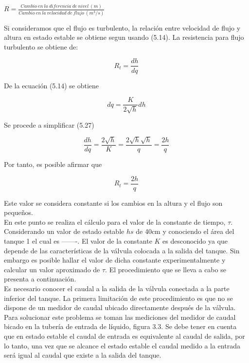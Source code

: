 \documentclass[a4paper,12pt,twoside]{proyectotanquesecci}
\begin{document}
\begin{center}
$R=\frac{Cambio\ en\ la\ diferencia\ de\ nivel\ (m)}{Cambio\ en\ la\ velocidad\ de\ flujo\ (m^{3}/s)}$
\end{center}

Si consideramos que el flujo es turbulento, la relación entre velocidad de flujo y altura en estado estable se obtiene segun usando (5.14). La resistencia para flujo turbulento se obtiene de:

\begin{equation}
R_{t}=\frac{dh}{dq}
\end{equation}

De la ecuación (5.14) se obtiene

\begin{equation}
dq=\frac{K}{2\sqrt{h}}dh
\end{equation}

Se procede a simplificar (5.27)

\begin{equation}
\frac{dh}{dq}=\frac{2\sqrt{h}}{K}=\frac{2\sqrt{h}\sqrt{h}}{q}=\frac{2h}{q}
\end{equation}

Por tanto, es posible afirmar que

\begin{equation}
R_{t}=\frac{2h}{q}
\end{equation}

Este valor se considera constante si los cambios en la altura y el flujo son pequeños. \\






En este punto se realiza el cálculo para el valor de la constante de tiempo, $\tau$. Considerando un valor de estado estable $hs$ de 40cm y conociendo el área del tanque 1 el cual es -------. El valor de la constante $K$ es desconocido ya que depende de las características de la válvula colocada a la salida del tanque. Sin embargo es posible hallar el valor de dicha constante experimentalmente y calcular un valor aproximado de $\tau$. El procedimiento que se lleva a cabo se presenta a continuación. \\

Es necesario conocer el caudal a la salida de la válvula conectada a la parte inferior del tanque. La primera limitación de este procedimiento es
que no se dispone de un medidor de caudal ubicado directamente después de la válvula. Para solucionar este problema se toman las mediciones del medidor de caudal bicado en la tubería de entrada de líquido, figura 3.3. Se debe tener en cuenta que en estado estable el caudal de entrada es equivalente al caudal de salida, por lo tanto, una vez que se alcance el estado estable el caudal medido a la entrada será igual al caudal que
existe a la salida del tanque. \\
\end{document}
